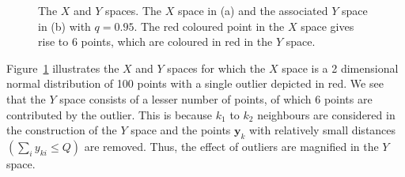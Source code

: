 \documentclass[11pt]{article}
\begin{document}
\begin{figure}
	\centering
	\caption{The $X$ and $Y$ spaces. The $X$ space in (a) and the associated $Y$ space in (b) with $q = 0.95$. The red coloured point in the $X$ space gives rise to 6   points, which are coloured in red in the $Y$ space.}
	\label{fig:XandY}
\end{figure} 

Figure~\ref{fig:XandY} illustrates  the $X$ and $Y$ spaces for which the $X$ space is a 2 dimensional normal distribution of 100 points with a single outlier depicted in red. We see that the $Y$ space consists of a lesser number of points, of which 6 points are contributed by the outlier. This is because $k_1$ to $k_2$ neighbours are considered in the construction of the $Y$ space and the  points $\bm{y}_k$ with relatively small distances $\left(\sum_i y_{ki} \leq Q\right)$ are removed. Thus, the effect of outliers are magnified in the $Y$ space. \\
\end{document}
